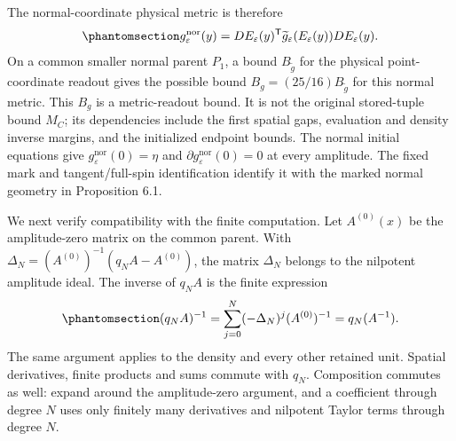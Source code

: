\documentclass[
  english,
  11pt,
  reqno]{amsart}
\begin{document}
The normal-coordinate physical metric is therefore
\begin{equation}\protect\phantomsection\label{eq:sh-r1-normal-metric-readout}{
 g^{\mathrm{nor}}_\varepsilon(y)
 =DE_\varepsilon(y)^{\mathsf T}
   \widetilde g_\varepsilon(E_\varepsilon(y))DE_\varepsilon(y).
}\end{equation} On a common smaller normal parent \(P_1\), a bound
\(B_{\widetilde g}\) for the physical point-coordinate readout gives the
possible bound \(B_g=(25/16)B_{\widetilde g}\) for this normal metric.
This \(B_g\) is a metric-readout bound. It is not the original
stored-tuple bound \(M_C\); its dependencies include the first spatial
gaps, evaluation and density inverse margins, and the initialized
endpoint bounds. The normal initial equations give
\(g^{\mathrm{nor}}_\varepsilon(0)=\eta\) and
\(\partial g^{\mathrm{nor}}_\varepsilon(0)=0\) at every amplitude. The
fixed mark and tangent/full-spin identification identify it with the
marked normal geometry in Proposition 6.1.

We next verify compatibility with the finite computation. Let
\(A^{(0)}(x)\) be the amplitude-zero matrix on the common parent. With
\(\Delta_N=(A^{(0)})^{-1}(q_NA-A^{(0)})\), the matrix \(\Delta_N\)
belongs to the nilpotent amplitude ideal. The inverse of \(q_NA\) is the
finite expression
\begin{equation}\protect\phantomsection\label{eq:sh-r1-finite-inverse-recursion}{
 (q_NA)^{-1}
 =\sum_{j=0}^{N}(-\Delta_N)^j(A^{(0)})^{-1}
 =q_N(A^{-1}).
}\end{equation} The same argument applies to the density and every other
retained unit. Spatial derivatives, finite products and sums commute
with \(q_N\). Composition commutes as well: expand around the
amplitude-zero argument, and a coefficient through degree \(N\) uses
only finitely many derivatives and nilpotent Taylor terms through degree
\(N\).
\end{document}
